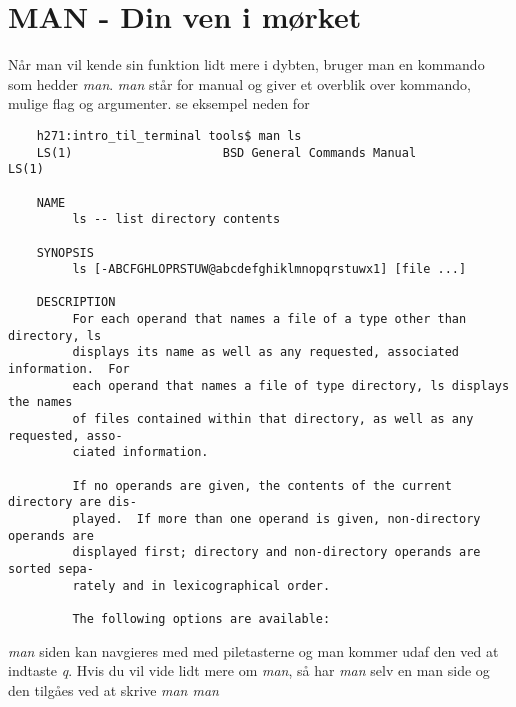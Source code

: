 \section{MAN - Din ven i mørket}
Når man vil kende sin funktion lidt mere i dybten, bruger man en kommando som hedder \textit{man}. \textit{man} står for manual og giver et overblik over kommando, mulige flag og argumenter. se eksempel neden for
\begin{lstlisting}
	h271:intro_til_terminal tools$ man ls
	LS(1)                     BSD General Commands Manual                    LS(1)

	NAME
	     ls -- list directory contents

	SYNOPSIS
	     ls [-ABCFGHLOPRSTUW@abcdefghiklmnopqrstuwx1] [file ...]

	DESCRIPTION
	     For each operand that names a file of a type other than directory, ls
	     displays its name as well as any requested, associated information.  For
	     each operand that names a file of type directory, ls displays the names
	     of files contained within that directory, as well as any requested, asso-
	     ciated information.

	     If no operands are given, the contents of the current directory are dis-
	     played.  If more than one operand is given, non-directory operands are
	     displayed first; directory and non-directory operands are sorted sepa-
	     rately and in lexicographical order.

	     The following options are available:
\end{lstlisting}
\textit{man} siden kan navgieres med med piletasterne og man kommer udaf den ved at indtaste \textit{q}. Hvis du vil vide lidt mere om \textit{man}, så har \textit{man} selv en man side og den tilgåes ved at skrive \textit{man man}
